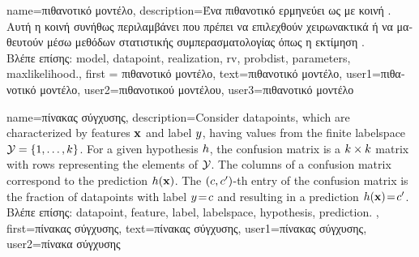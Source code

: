 {name={\foreignlanguage{greek}{πιθανοτικό μοντέλο}},
	description={\foreignlanguage{greek}{Ένα πιθανοτικό}  
		\foreignlanguage{greek}{ερμηνεύει}  \foreignlanguage{greek}{ως}
		  \foreignlanguage{greek}{με κοινή} . \foreignlanguage{greek}{Αυτή η κοινή} 
		 \foreignlanguage{greek}{συνήθως περιλαμβάνει} 
		 \foreignlanguage{greek}{που πρέπει να επιλεχθούν χειρωνακτικά ή να μαθευτούν μέσω μεθόδων στατιστικής  
		συμπερασματολογίας όπως η εκτίμηση}   \cite{LC}.\\
		\foreignlanguage{greek}{Βλέπε επίσης:} \gls{model}, \gls{datapoint}, \gls{realization}, \gls{rv}, \gls{probdist}, \gls{parameters}, \gls{maxlikelihood}.}, 
	first = {\foreignlanguage{greek}{πιθανοτικό μοντέλο}}, 
	text={\foreignlanguage{greek}{πιθανοτικό μοντέλο}},
	user1={\foreignlanguage{greek}{πιθανοτικό μοντέλο}}, %
   	user2={\foreignlanguage{greek}{πιθανοτικού μοντέλου}}, %
	user3={\foreignlanguage{greek}{πιθανοτικό μοντέλο}} %
}

{name={\foreignlanguage{greek}{πίνακας σύγχυσης}}, 
	description={Consider \gls{datapoint}s, which are characterized 
		by \gls{feature}s ${\bf x}$ and \gls{label} $y$, having values from the finite 
		\gls{labelspace} $\mathcal{Y} = \{1,\ldots,k\}$. For a given \gls{hypothesis} $h$, 
		the confusion matrix is a $k \times k$ matrix with rows representing the elements of 
		$\mathcal{Y}$. The columns of a confusion matrix correspond to the \gls{prediction} $h({\bf x})$. 
		The $(c,c')$-th entry of the confusion matrix is the fraction of 
		\gls{datapoint}s with \gls{label} $y\!=\! c$ and resulting in a \gls{prediction} $h({\bf x})\!=\!c'$.\\
		\foreignlanguage{greek}{Βλέπε επίσης:} \gls{datapoint}, \gls{feature}, \gls{label}, \gls{labelspace}, \gls{hypothesis}, \gls{prediction}. },
	first={\foreignlanguage{greek}{πίνακας σύγχυσης}},
	text={\foreignlanguage{greek}{πίνακας σύγχυσης}},
	user1={\foreignlanguage{greek}{πίνακας σύγχυσης}}, %
	user2={\foreignlanguage{greek}{πίνακα σύγχυσης}} %
}

